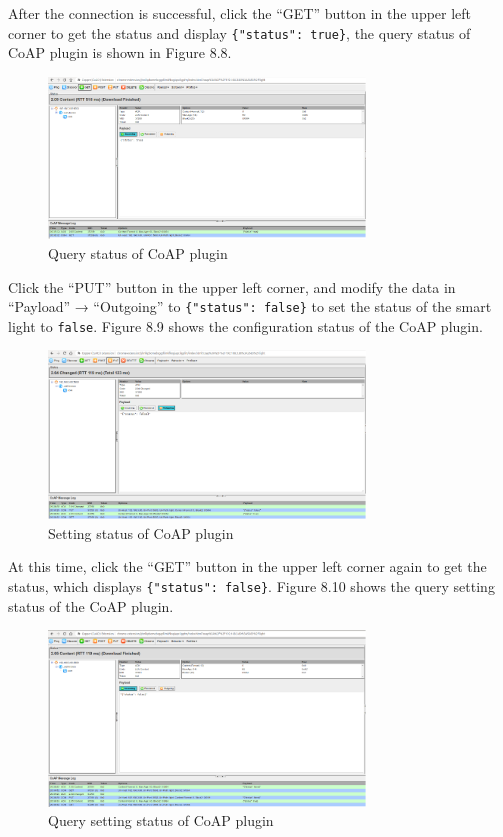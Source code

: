\documentclass[a4paper,12pt,openany]{book}
\begin{document}
After the connection is successful, click the “GET” button in the upper left corner to get the status and display \verb|{"status": true}|, the query status of CoAP plugin is shown in Figure 8.8.

\begin{figure}[!h]
    \centering
    \includegraphics[width=0.75\textwidth]{D8Z/8-8}
    \caption{Query status of CoAP plugin}
\end{figure}

Click the “PUT” button in the upper left corner, and modify the data in “Payload” → “Outgoing” to \verb|{"status": false}| to set the status of the smart light to \verb|false|. Figure 8.9 shows the configuration status of the CoAP plugin.

\begin{figure}[!h]
    \centering
    \includegraphics[width=0.75\textwidth]{D8Z/8-9}
    \caption{Setting status of CoAP plugin}
\end{figure}

At this time, click the “GET” button in the upper left corner again to get the status, which displays \verb|{"status": false}|. Figure 8.10 shows the query setting status of the CoAP plugin.

\begin{figure}[!h]
    \centering
    \includegraphics[width=0.75\textwidth]{D8Z/8-10}
    \caption{Query setting status of CoAP plugin}
\end{figure}
\end{document}
